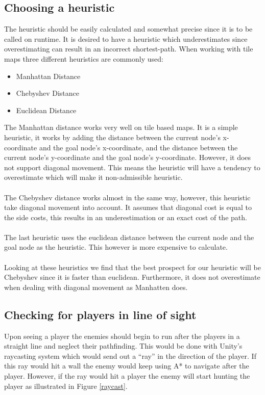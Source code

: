 \subsection*{Choosing a heuristic}
The heuristic should be easily calculated and somewhat precise since it is to be called on runtime.
It is desired to have a heuristic which underestimates since overestimating can result in an incorrect shortest-path.
When working with tile maps three different heuristics are commonly used\cite{heuristics}:
\begin{itemize}
\item Manhattan Distance
\item Chebyshev Distance
\item Euclidean Distance
\end{itemize}
The Manhattan distance works very well on tile based maps. 
It is a simple heuristic, it works by adding the distance between the current node's x-coordinate and the goal node's x-coordinate, and the distance between the current node's y-coordinate and the goal node's y-coordinate.
However, it does not support diagonal movement. 
This means the heuristic will have a tendency to overestimate which will make it non-admissible heuristic.\\\\
The Chebyshev distance works almost in the same way, however, this heuristic take diagonal movement into account. 
It assumes that diagonal cost is equal to the side costs, this results in an underestimation or an exact cost of the path.\\\\
The last heuristic uses the euclidean distance between the current node and the goal node as the heuristic.
This however is more expensive to calculate.\\\\
Looking at these heuristics we find that the best prospect for our heuristic will be Chebyshev since it is faster than euclidean. 
Furthermore, it does not overestimate when dealing with diagonal movement as Manhatten does.

\subsection*{Checking for players in line of sight}
Upon seeing a player the enemies should begin to run after the players in a straight line and neglect their pathfinding. 
This would be done with Unity's raycasting system which would send out a ``ray'' in the direction of the player. 
If this ray would hit a wall the enemy would keep using A* to navigate after the player.
However, if the ray would hit a player the enemy will start hunting the player as illustrated in Figure \ref{raycast}.

